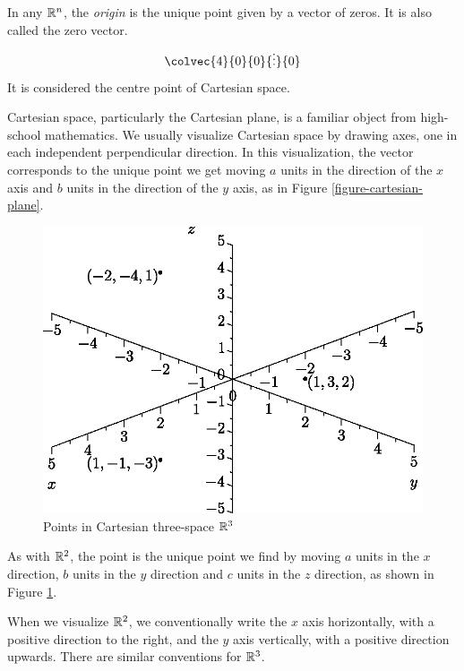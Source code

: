 \documentclass[fleqn,letterpaper]{report}
\begin{document}
\begin{defn}
In any $\mathbb{R}^n$, the \emph{origin} is the unique point given by a
vector of zeros. It is also called the zero vector.
\begin{displaymath}
\colvec{4}{0}{0}{\vdots}{0}
\end{displaymath}
It is considered the centre point of Cartesian space.
\end{defn}

Cartesian space, particularly the Cartesian plane, is a
familiar object from high-school mathematics. We usually
visualize Cartesian space by drawing axes, one in each
independent perpendicular direction.  In this visualization,
the vector  corresponds to
the unique point we get moving $a$ units in the direction of
the $x$ axis and $b$ units in the direction of the $y$ axis,
as in Figure \ref{figure-cartesian-plane}.

\begin{figure}[t]
\centering
\includegraphics[scale=1]{figure02.eps}
\caption{Points in Cartesian three-space $\mathbb{R}^3$}
\label{figure-three-space}
\end{figure}

As with $\mathbb{R}^2$, the point  is the unique point we find by moving $a$ units in the
$x$ direction, $b$ units in the $y$ direction and $c$ units in
the $z$ direction, as shown in Figure \ref{figure-three-space}.

When we visualize $\mathbb{R}^2$, we conventionally write
the $x$ axis horizontally, with a positive direction to the
right, and the $y$ axis vertically, with a positive direction
upwards. There are similar conventions for $\mathbb{R}^3$. 
\end{document}
